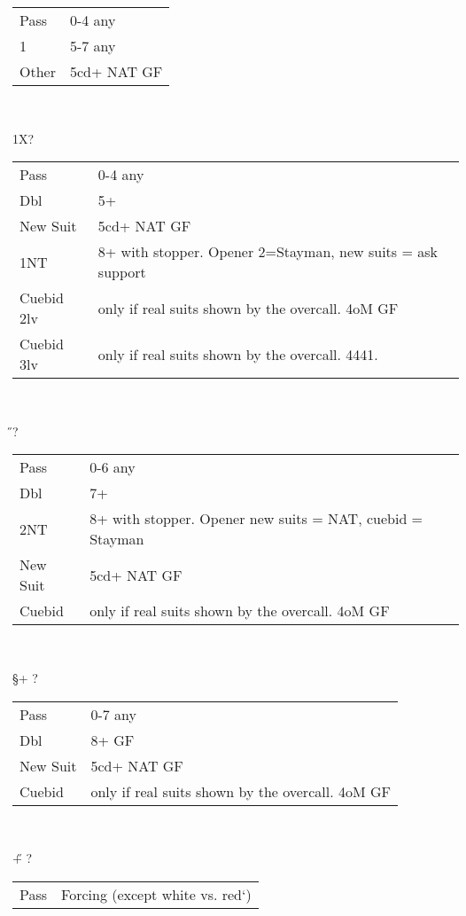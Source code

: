 \begin{xtabular}{ll}
Pass & 0-4 any \\
1\D & 5-7 any \\
Other & 5cd+ NAT GF \\
\end{xtabular}\\

\begin{bidding}
\>\C\>1X\>?
\end{bidding}

\begin{xtabular}{ll}
Pass & 0-4 any \\
Dbl & 5+ \\
New Suit & 5cd+ NAT GF \\
1NT & 8+ with stopper. Opener 2\C=Stayman, new suits = ask support \\
Cuebid 2lv & only if real suits shown by the overcall. 4oM GF \\
Cuebid 3lv & only if real suits shown by the overcall. 4441. \\
\end{xtabular}\\

\begin{bidding}
\>\C{}\H\>?
\end{bidding}

\begin{xtabular}{ll}
Pass & 0-6 any \\
Dbl & 7+ \\
2NT & 8+ with stopper. Opener new suits = NAT, cuebid = Stayman \\
New Suit & 5cd+ NAT GF \\
Cuebid & only if real suits shown by the overcall. 4oM GF \\
\end{xtabular}\\

\begin{bidding}
\>\C{}\S+ \>?
\end{bidding}

\begin{xtabular}{ll}
Pass & 0-7 any \\
Dbl & 8+ GF \\
New Suit & 5cd+ NAT GF \\
Cuebid & only if real suits shown by the overcall. 4oM GF \\
\end{xtabular}\\

\begin{bidding}
\>\C{}\H+ \>?
\end{bidding}

\begin{xtabular}{ll}
Pass & Forcing (except white vs. red`) \\
\end{xtabular}\\


